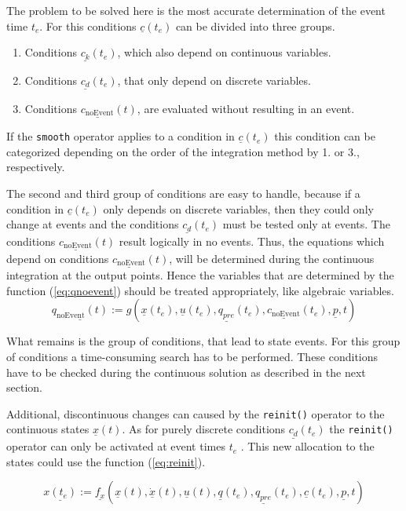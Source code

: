 The problem to be solved here is the most accurate determination of the event
time $t_e$. For this conditions $\underline{c}(t_e)$ can be divided into three
groups.
\begin{enumerate}
  \item Conditions $\underline{c_k}(t_e)$, which also depend on continuous
  variables.
  \item Conditions $\underline{c_d}(t_e)$, that only depend on discrete
  variables.
  \item Conditions $\underline{c_{\text{noEvent}}}(t)$, are evaluated without
  resulting in an event.
\end{enumerate}

If the \verb+smooth+ operator applies to a condition in $\underline{c}(t_e)$
this condition can be categorized depending on the order of the integration
method by 1. or 3., respectively.

The second and third group of conditions are easy to handle, because if a
condition in $\underline{c}(t_e)$ only depends on discrete variables, then they
could only change at events and the conditions $\underline{c_d}(t_e)$ must be
tested only at events. The conditions $\underline{c_{\text{noEvent}}}(t)$
result logically in no events. Thus, the equations which depend on conditions
$\underline{c_{\text{noEvent}}}(t)$, will be determined during the continuous
integration at the output points. Hence the variables that are determined by
the function (\ref{eq:qnoevent}) should be treated appropriately, like
algebraic variables.
\begin{equation}\label{eq:qnoevent}
\underline{q_{\text{noEvent}}(t)} :=
g(\underline{x}(t_e), \underline{u}(t_e), \underline{q_{pre}}(t_e),
\underline{c_{\text{noEvent}}}(t_e), \underline{p} ,t)
\end{equation}

What remains is the group of conditions, that lead to state events. For this
group of conditions a time-consuming search has to be performed.  These
conditions have to be checked during the continuous solution as described in the
next section.

Additional, discontinuous changes can caused by the \verb+reinit()+ operator to
the continuous states $\underline{x}(t)$. 
As for purely discrete conditions $\underline{c_d}(t_e)$ the \verb+reinit()+
operator can only be activated at event times $t_e$ . This new allocation to
the states could use the function (\ref{eq:reinit}).

\begin{equation}\label{eq:reinit}
\underline{x(t_e)} := \underline{f_x}(\underline{x}(t),\underline{\dot
x}(t), \underline{u}(t), \underline{q}(t_e), \underline{q_{pre}}(t_e),
\underline{c}(t_e), \underline{p} ,t)
\end{equation}


